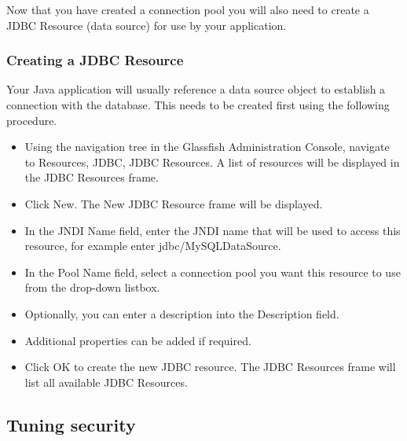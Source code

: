 Now that you have created a connection pool you will also need to create a JDBC
Resource (data source) for use by your application.

\subsubsection{Creating a JDBC Resource}
Your Java application will usually reference a data source object to establish a
connection with the database. This needs to be created first using the following procedure.

\begin{itemize}
  \item Using the navigation tree in the Glassfish Administration Console,
  navigate to Resources, JDBC, JDBC Resources. A list of resources will be
  displayed in the JDBC Resources frame.
  \item Click New. The New JDBC Resource frame will be displayed.
  \item In the JNDI Name field, enter the JNDI name that will be used to access
  this resource, for example enter jdbc/MySQLDataSource.
  \item In the Pool Name field, select a connection pool you want this resource
  to use from the drop-down listbox.
  \item Optionally, you can enter a description into the Description field.
  \item Additional properties can be added if required.
  \item Click OK to create the new JDBC resource. The JDBC Resources frame will
  list all available JDBC Resources.

\end{itemize}
\subsection{Tuning security}